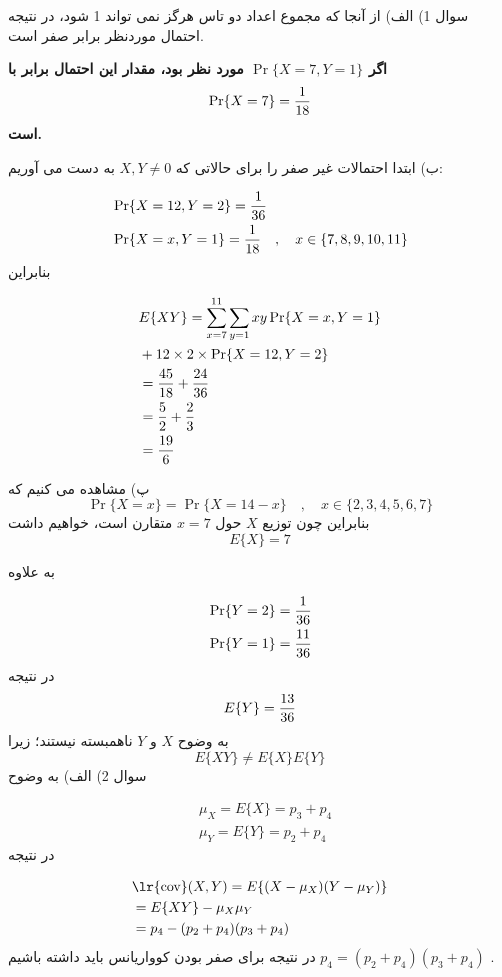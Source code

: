 \documentclass[10pt,letterpaper]{report}
\newcommand{\eqn}[1]{
\[\begin{split}
#1
\end{split}\]
}
\begin{document}
سوال 1) الف) از آنجا که مجموع اعداد دو تاس هرگز نمی تواند 1 شود، در نتیجه احتمال موردنظر برابر صفر است.

\textbf{
اگر 
$
\Pr\{X=7,Y=1\}
$
 مورد نظر بود، مقدار این احتمال برابر با 
$$
\Pr\{X=7\}={1\over 18}
$$
 است.
}

ب) ابتدا احتمالات غیر صفر را برای حالاتی که $X,Y\ne 0$ به دست می آوریم:
\eqn{
&\Pr\{X=12,Y=2\}={1\over 36}
\\&\Pr\{X=x,Y=1\}={1\over 18}\quad,\quad x\in\{7,8,9,10,11\}
}{}
بنابراین
\eqn{
&E\{XY\}=\sum_{x=7}^{11}\sum_{y=1}xy\Pr\{X=x,Y=1\}
\\&+12\times 2\times\Pr\{X=12,Y=2\}
\\&={45\over 18}+{24\over 36}
\\&={5\over 2}+{2\over 3}
\\&={19\over 6}
}{}

پ) مشاهده می کنیم که 
$$
\Pr\{X=x\}=\Pr\{X=14-x\}\quad,\quad x\in\{2,3,4,5,6,7\}
$$
بنابراین چون توزیع $X$ حول $x=7$ متقارن است، خواهیم داشت 
$$
E\{X\}=7
$$

به علاوه
\eqn{
&\Pr\{Y=2\}={1\over 36}
\\&\Pr\{Y=1\}={11\over 36}
}{}
در نتیجه
$$
E\{Y\}={13\over 36}
$$
به وضوح $X$ و $Y$ ناهمبسته نیستند؛ زیرا 
$$
E\{XY\}\ne E\{X\}E\{Y\}
$$
\newline\newline
سوال 2) الف) به وضوح 
\eqn{
&\mu_X=E\{X\}=p_3+p_4
\\&\mu_Y=E\{Y\}=p_2+p_4
}{}
در نتیجه
\eqn{
&\text{\lr{cov}}(X,Y)=E\{(X-\mu_X)(Y-\mu_Y)\}
\\&=E\{XY\}-\mu_X\mu_Y
\\&=p_4-(p_2+p_4)(p_3+p_4)
}{}
در نتیجه برای صفر بودن کوواریانس باید داشته باشیم 
$
p_4=(p_2+p_4)(p_3+p_4)
$
.
\end{document}
